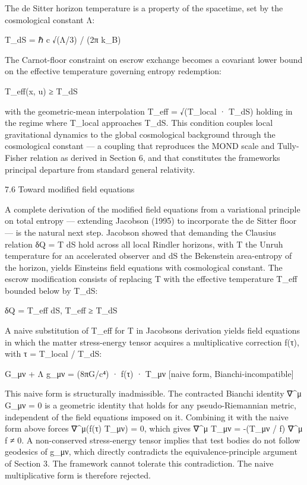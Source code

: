 \documentclass[11pt]{article}
\begin{document}
The de Sitter horizon temperature is a property of the spacetime, set by the cosmological constant Λ:

T\_dS = ℏ c √(Λ/3) / (2π k\_B)

The Carnot-floor constraint on escrow exchange becomes a covariant lower bound on the effective temperature governing entropy redemption:

T\_eff(x, u) ≥ T\_dS

with the geometric-mean interpolation T\_eff = √(T\_local · T\_dS) holding in the regime where T\_local approaches T\_dS. This condition couples local gravitational dynamics to the global cosmological background through the cosmological constant --- a coupling that reproduces the MOND scale and Tully-Fisher relation as derived in Section 6, and that constitutes the framework\textquotesingle s principal departure from standard general relativity.

7.6 Toward modified field equations

A complete derivation of the modified field equations from a variational principle on total entropy --- extending Jacobson (1995) to incorporate the de Sitter floor --- is the natural next step. Jacobson showed that demanding the Clausius relation δQ = T dS hold across all local Rindler horizons, with T the Unruh temperature for an accelerated observer and dS the Bekenstein area-entropy of the horizon, yields Einstein\textquotesingle s field equations with cosmological constant. The escrow modification consists of replacing T with the effective temperature T\_eff bounded below by T\_dS:

δQ = T\_eff dS, T\_eff ≥ T\_dS

A naive substitution of T\_eff for T in Jacobson\textquotesingle s derivation yields field equations in which the matter stress-energy tensor acquires a multiplicative correction f(τ), with τ = T\_local / T\_dS:

G\_μν + Λ g\_μν = (8πG/c⁴) · f(τ) · T\_μν {[}naive form, Bianchi-incompatible{]}

This naive form is structurally inadmissible. The contracted Bianchi identity ∇\^{}μ G\_μν = 0 is a geometric identity that holds for any pseudo-Riemannian metric, independent of the field equations imposed on it. Combining it with the naive form above forces ∇\^{}μ(f(τ) T\_μν) = 0, which gives ∇\^{}μ T\_μν = -(T\_μν / f) ∇\^{}μ f ≠ 0. A non-conserved stress-energy tensor implies that test bodies do not follow geodesics of g\_μν, which directly contradicts the equivalence-principle argument of Section 3. The framework cannot tolerate this contradiction. The naive multiplicative form is therefore rejected.
\end{document}

